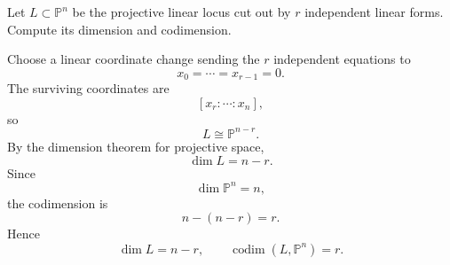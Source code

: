 \begin{problem}\label{prob:vi36-04}
Let \(L\subset\mathbb P^n\) be the projective linear locus cut out by \(r\) independent linear forms. Compute its dimension and codimension.
\end{problem}

\ifdefined\FullProblemDossiers
\begin{solution}
Choose a linear coordinate change sending the \(r\) independent equations to
\[
x_0=\cdots=x_{r-1}=0.
\]
The surviving coordinates are
\[
[x_r:\cdots:x_n],
\]
so
\[
L\cong\mathbb P^{n-r}.
\]
By the dimension theorem for projective space,
\[
\dim L=n-r.
\]
Since
\[
\dim\mathbb P^n=n,
\]
the codimension is
\[
n-(n-r)=r.
\]
Hence
\[
\boxed{
\dim L=n-r,
\qquad
\operatorname{codim}(L,\mathbb P^n)=r.
}
\]
\end{solution}
\fi
